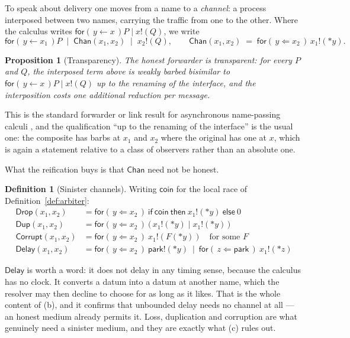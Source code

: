 \documentclass[11pt]{article}
\newtheorem{proposition}[theorem]{Proposition}
\theoremstyle{definition}
\newtheorem{definition}[theorem]{Definition}
\newcommand{\In}[2]{\mathsf{for}(\,#1 \leftarrow #2\,)}
\newcommand{\Inp}[2]{\mathsf{for}(\,#1 \Leftarrow #2\,)}
\begin{document}
To speak about delivery one moves from a name to a \emph{channel}: a process interposed between two names, carrying the traffic from one to the other. Where the calculus writes $\In{y}{x}P \mid x!(Q)$, we write
\[
  \In{y}{x_1}P \;\mid\; \mathsf{Chan}(x_1, x_2) \;\mid\; x_2!(Q) ,
  \qquad
  \mathsf{Chan}(x_1,x_2) \;=\; \Inp{y}{x_2}\, x_1!({*}y) .
\]

\begin{proposition}[Transparency]\label{prop:chan}
The honest forwarder is transparent: for every $P$ and $Q$, the interposed term above is weakly barbed bisimilar to $\In{y}{x}P \mid x!(Q)$ up to the renaming of the interface, and the interposition costs one additional reduction per message.
\end{proposition}

This is the standard forwarder or link result for asynchronous name-passing calculi \cite{HondaTokoro,MerroSangiorgi}, and the qualification ``up to the renaming of the interface'' is the usual one: the composite has barbs at $x_1$ and $x_2$ where the original has one at $x$, which is again a statement relative to a class of observers rather than an absolute one.

What the reification buys is that $\mathsf{Chan}$ need not be honest.

\begin{definition}[Sinister channels]\label{def:sinister}
Writing $\mathsf{coin}$ for the local race of Definition~\ref{def:arbiter}:
\begin{align*}
  \mathsf{Drop}(x_1,x_2) &= \Inp{y}{x_2}\ \mathsf{if}\ \mathsf{coin}\ \mathsf{then}\ x_1!({*}y)\ \mathsf{else}\ 0 \\
  \mathsf{Dup}(x_1,x_2) &= \Inp{y}{x_2}\ \big(\,x_1!({*}y) \mid x_1!({*}y)\,\big) \\
  \mathsf{Corrupt}(x_1,x_2) &= \Inp{y}{x_2}\ x_1!(F({*}y)) \quad \text{for some } F \\
  \mathsf{Delay}(x_1,x_2) &= \Inp{y}{x_2}\ \mathsf{park}!({*}y) \ \mid\ \Inp{z}{\mathsf{park}}\ x_1!({*}z)
\end{align*}
\end{definition}

$\mathsf{Delay}$ is worth a word: it does not delay in any timing sense, because the calculus has no clock. It converts a datum into a datum at another name, which the resolver may then decline to choose for as long as it likes. That is the whole content of (b), and it confirms that unbounded delay needs no channel at all --- an honest medium already permits it. Loss, duplication and corruption are what genuinely need a sinister medium, and they are exactly what (c) rules out.
\end{document}
